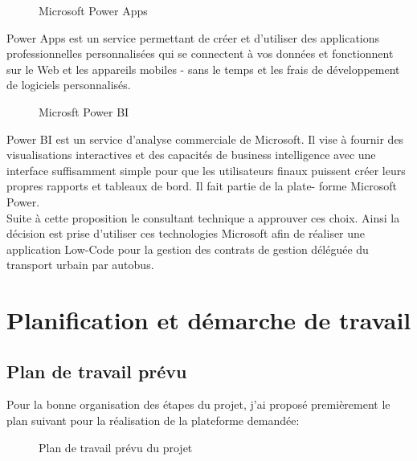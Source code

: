 \documentclass[a4paper]{report}
\begin{document}
\begin{doublespace}
\begin{figure}[H]
\begin{center}
			\caption{Microsoft Power Apps}
		\end{center}
	\end{figure}
	Power Apps est un service permettant de créer
	et d'utiliser des applications professionnelles
	personnalisées qui se connectent à vos
	données et fonctionnent sur le Web et les
	appareils mobiles - sans le temps et les frais
	de développement de logiciels personnalisés.
	\begin{figure}[H]
		\begin{center}
			\caption{Microsft Power BI}
		\end{center}
	\end{figure}
	Power BI est un service d'analyse
	commerciale de Microsoft. Il vise à fournir des
	visualisations interactives et des capacités de
	business intelligence avec une interface
	suffisamment simple pour que les utilisateurs
	finaux puissent créer leurs propres rapports et
	tableaux de bord. Il fait partie de la plate-
	forme Microsoft Power.\\
	Suite à cette proposition le consultant technique a approuver ces choix. Ainsi la décision est prise d'utiliser ces technologies Microsoft afin de réaliser une application Low-Code pour la gestion des contrats de gestion déléguée du transport urbain par autobus.
	\section{Planification et démarche de travail}
	\subsection{Plan de travail prévu}
	Pour la bonne organisation des étapes du projet, j'ai proposé premièrement le plan suivant pour la réalisation de la plateforme demandée:
	\begin{figure}[H]
		\begin{center}
			\caption{Plan de travail prévu du projet}
		\end{center}
	\end{figure}

\end{doublespace}
\end{document}
